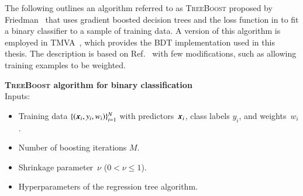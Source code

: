 


The following outlines an algorithm referred to as \textsc{TreeBoost} proposed
by Friedman~\cite{Friedman:2001wbq} that uses gradient boosted decision trees
and the loss function in  to fit a binary classifier to
a sample of training data. A version of this algorithm is employed in
\textsc{TMVA}~\cite{TMVA}, which provides the BDT implementation used in this
thesis. The description is based on Ref.~\cite{Friedman:2001wbq} with few
modifications, such as allowing training examples to be weighted.

\vspace{11pt}
\noindent\textbf{\textsc{TreeBoost} algorithm for binary classification} \\[11pt]
\noindent Inputs:
\begin{itemize}[itemsep=1pt,topsep=4pt]
\item Training data $\{(\myvec{x}_i, y_i, w_i)\}_{i = 1}^{N}$ with
  predictors~$\myvec{x}_i$, class labels $y_i$, and weights~$w_i$.
\item Number of boosting iterations $M$.
\item Shrinkage parameter~$\nu$ ($0 < \nu \leq 1$).
\item Hyperparameters of the regression tree algorithm.
\end{itemize}

